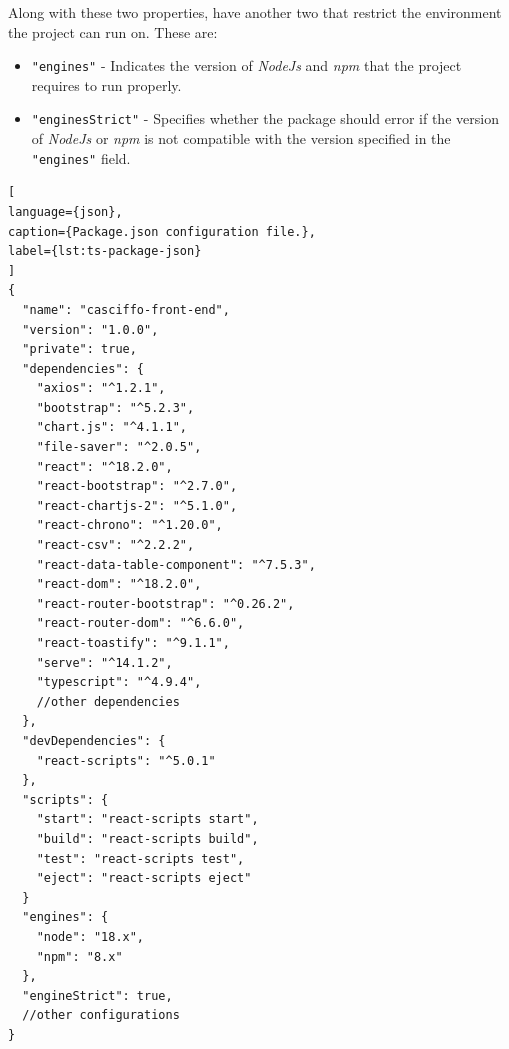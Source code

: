 Along with these two properties, have another two that restrict the environment the project can run on. These are:
\begin{itemize}
    \item \lstinline[keywordstyle=\color{black},commentstyle=\color{black},stringstyle=\color{black}]{"engines"} - Indicates the version of \textit{NodeJs} and \textit{npm} that the project requires to run properly.
    \item \lstinline[keywordstyle=\color{black},commentstyle=\color{black},stringstyle=\color{black}]{"enginesStrict"} - Specifies whether the package should error if the version of \textit{NodeJs} or \textit{npm} is not compatible with the version specified in the \lstinline[keywordstyle=\color{black},commentstyle=\color{black},stringstyle=\color{black}]{"engines"} field. 
\end{itemize}

\begin{lstlisting}[
language={json},
caption={Package.json configuration file.},
label={lst:ts-package-json}
]
{
  "name": "casciffo-front-end",
  "version": "1.0.0",
  "private": true,
  "dependencies": {
    "axios": "^1.2.1",
    "bootstrap": "^5.2.3",
    "chart.js": "^4.1.1",
    "file-saver": "^2.0.5",
    "react": "^18.2.0",
    "react-bootstrap": "^2.7.0",
    "react-chartjs-2": "^5.1.0",
    "react-chrono": "^1.20.0",
    "react-csv": "^2.2.2",
    "react-data-table-component": "^7.5.3",
    "react-dom": "^18.2.0",
    "react-router-bootstrap": "^0.26.2",
    "react-router-dom": "^6.6.0",
    "react-toastify": "^9.1.1",
    "serve": "^14.1.2",
    "typescript": "^4.9.4",
    //other dependencies
  },
  "devDependencies": {
    "react-scripts": "^5.0.1"
  },
  "scripts": {
    "start": "react-scripts start",
    "build": "react-scripts build",
    "test": "react-scripts test",
    "eject": "react-scripts eject"
  }
  "engines": {
    "node": "18.x",
    "npm": "8.x"
  },
  "engineStrict": true,
  //other configurations
}
\end{lstlisting}


